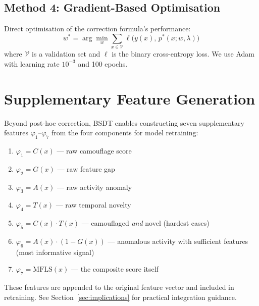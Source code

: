 \documentclass[journal]{IEEEtran}
\newcommand{\MFLS}{\mathrm{MFLS}}
\begin{document}
\subsection{Method 4: Gradient-Based Optimisation}
\label{ssec:gradient}

Direct optimisation of the correction formula's performance:
\begin{equation}
  w^* = \arg\min_w \sum_{x \in \mathcal{V}} \ell\bigl(y(x),\, p^*(x; w, \lambda)\bigr)
  \label{eq:gradient}
\end{equation}
where $\mathcal{V}$ is a validation set and $\ell$ is the binary cross-entropy loss. We use Adam with learning rate $10^{-3}$ and 100 epochs.

\section{Supplementary Feature Generation}
\label{sec:features}

Beyond post-hoc correction, BSDT enables constructing seven supplementary features $\varphi_1$--$\varphi_7$ from the four components for model retraining:

\begin{enumerate}
  \item $\varphi_1 = C(x)$ --- raw camouflage score
  \item $\varphi_2 = G(x)$ --- raw feature gap
  \item $\varphi_3 = A(x)$ --- raw activity anomaly
  \item $\varphi_4 = T(x)$ --- raw temporal novelty
  \item $\varphi_5 = C(x) \cdot T(x)$ --- camouflaged \textit{and} novel (hardest cases)
  \item $\varphi_6 = A(x) \cdot (1 - G(x))$ --- anomalous activity with sufficient features (most informative signal)
  \item $\varphi_7 = \MFLS(x)$ --- the composite score itself
\end{enumerate}

These features are appended to the original feature vector and included in retraining. See Section~\ref{sec:implications} for practical integration guidance.

\end{document}

